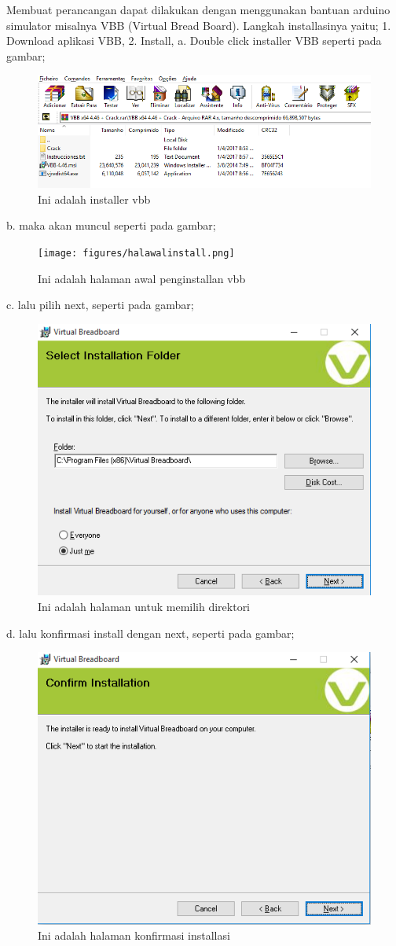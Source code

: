 Membuat perancangan dapat dilakukan dengan menggunakan bantuan arduino simulator misalnya VBB (Virtual Bread Board). Langkah installasinya yaitu;
1. Download aplikasi VBB,
2. Install,
    a. Double click installer VBB seperti pada gambar;
\begin{figure}[ht]
  \centerline{\includegraphics[width=.75\textwidth]{figures/installer.png}}
  \caption{Ini adalah installer vbb}
  \label{fig:installer}
  \end{figure}
    b. maka akan muncul seperti pada gambar;
\begin{figure}[ht]
  \centerline{\texttt{[image: figures/halawalinstall.png]}}
  \caption{Ini adalah halaman awal penginstallan vbb}
  \label{fig:halawalinstall}
  \end{figure}
    c. lalu pilih next, seperti pada gambar;
\begin{figure}[ht]
  \centerline{\includegraphics[width=.75\textwidth]{figures/memilihdirektori.png}}
  \caption{Ini adalah halaman untuk memilih direktori}
  \label{fig:memilihdirektori}
  \end{figure}
    d. lalu konfirmasi install dengan next, seperti pada gambar;
\begin{figure}[ht]
  \centerline{\includegraphics[width=.75\textwidth]{figures/konfirmasiinstall.png}}
  \caption{Ini adalah halaman konfirmasi installasi}
  \label{fig:konfirmasiinstall}
  \end{figure}
